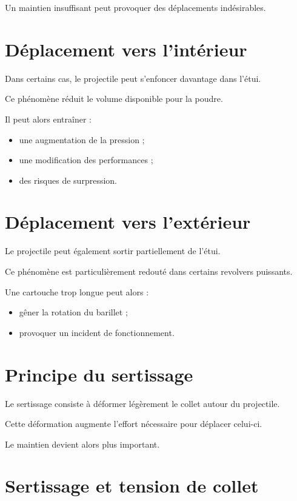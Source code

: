 Un maintien insuffisant peut provoquer des déplacements indésirables.

\section{Déplacement vers l'intérieur}

Dans certains cas, le projectile peut s'enfoncer davantage dans l'étui.

Ce phénomène réduit le volume disponible pour la poudre.

Il peut alors entraîner :

\begin{itemize}
    \item une augmentation de la pression ;
    \item une modification des performances ;
    \item des risques de surpression.
\end{itemize}

\section{Déplacement vers l'extérieur}

Le projectile peut également sortir partiellement de l'étui.

Ce phénomène est particulièrement redouté dans certains revolvers puissants.

Une cartouche trop longue peut alors :

\begin{itemize}
    \item gêner la rotation du barillet ;
    \item provoquer un incident de fonctionnement.
\end{itemize}

\section{Principe du sertissage}

Le sertissage consiste à déformer légèrement le collet autour du projectile.

Cette déformation augmente l'effort nécessaire pour déplacer celui-ci.

Le maintien devient alors plus important.

\section{Sertissage et tension de collet}

